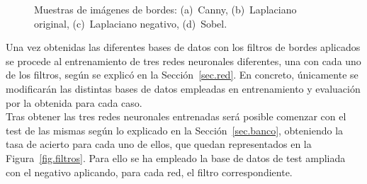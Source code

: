 \begin{figure}[H]
	\centering
	 \hspace{10pt}
	 \hspace{10pt}
	 \hspace{10pt}
	\caption{Muestras de imágenes de bordes: (a)~Canny, (b)~Laplaciano original, (c)~Laplaciano negativo, (d)~Sobel.}
	\label{fig.bordes}
\end{figure}

Una vez obtenidas las diferentes bases de datos con los filtros de bordes aplicados se procede al entrenamiento de tres redes neuronales diferentes, una con cada uno de los filtros, según se explicó en la Sección~\ref{sec.red}. En concreto, únicamente se modificarán las distintas bases de datos empleadas en entrenamiento y evaluación por la obtenida para cada caso.\\

Tras obtener las tres redes neuronales entrenadas será posible comenzar con el test de las mismas según lo explicado en la Sección~\ref{sec.banco}, obteniendo la tasa de acierto para cada uno de ellos, que quedan representados en la Figura~\ref{fig.filtros}. Para ello se ha empleado la base de datos de test ampliada con el negativo aplicando, para cada red, el filtro correspondiente.

